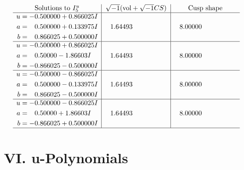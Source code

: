 \documentclass[1p]{elsarticle_modified}
\theoremstyle{definition}
\newcommand{\I}{\sqrt{-1}}
\begin{document}
$$\begin{array}{c|c|c}  
\text{Solutions to }I^u_{5}& \I (\text{vol} + \sqrt{-1}CS) & \text{Cusp shape}\\
 \hline 
\begin{aligned}
u &= -0.500000 + 0.866025 I \\
a &= \phantom{-}0.500000 + 0.133975 I \\
b &= \phantom{-}0.866025 + 0.500000 I\end{aligned}
 & \phantom{-}1.64493\phantom{ +0.000000I} & \phantom{-}8.00000\phantom{ +0.000000I} \\ \hline\begin{aligned}
u &= -0.500000 + 0.866025 I \\
a &= \phantom{-}0.50000 - 1.86603 I \\
b &= -0.866025 - 0.500000 I\end{aligned}
 & \phantom{-}1.64493\phantom{ +0.000000I} & \phantom{-}8.00000\phantom{ +0.000000I} \\ \hline\begin{aligned}
u &= -0.500000 - 0.866025 I \\
a &= \phantom{-}0.500000 - 0.133975 I \\
b &= \phantom{-}0.866025 - 0.500000 I\end{aligned}
 & \phantom{-}1.64493\phantom{ +0.000000I} & \phantom{-}8.00000\phantom{ +0.000000I} \\ \hline\begin{aligned}
u &= -0.500000 - 0.866025 I \\
a &= \phantom{-}0.50000 + 1.86603 I \\
b &= -0.866025 + 0.500000 I\end{aligned}
 & \phantom{-}1.64493\phantom{ +0.000000I} & \phantom{-}8.00000\phantom{ +0.000000I}\\
 \hline 
 \end{array}$$\newpage
\newpage\renewcommand{\arraystretch}{1}
\centering \section*{ VI. u-Polynomials}
\end{document}
